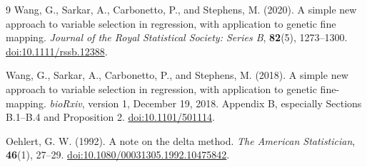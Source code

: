 \documentclass[11pt]{article}
\begin{document}
\begin{thebibliography}{9}
Wang, G., Sarkar, A., Carbonetto, P., and Stephens, M. (2020).
A simple new approach to variable selection in regression, with
application to genetic fine mapping.
\emph{Journal of the Royal Statistical Society: Series B},
\textbf{82}(5), 1273--1300.
\href{https://doi.org/10.1111/rssb.12388}{doi:10.1111/rssb.12388}.

Wang, G., Sarkar, A., Carbonetto, P., and Stephens, M. (2018).
A simple new approach to variable selection in regression, with
application to genetic fine-mapping.
\emph{bioRxiv}, version 1, December 19, 2018.
Appendix B, especially Sections B.1--B.4 and Proposition 2.
\href{https://doi.org/10.1101/501114}{doi:10.1101/501114}.

Oehlert, G. W. (1992).
A note on the delta method.
\emph{The American Statistician}, \textbf{46}(1), 27--29.
\href{https://doi.org/10.1080/00031305.1992.10475842}
 {doi:10.1080/00031305.1992.10475842}.
\end{thebibliography}
\end{document}

